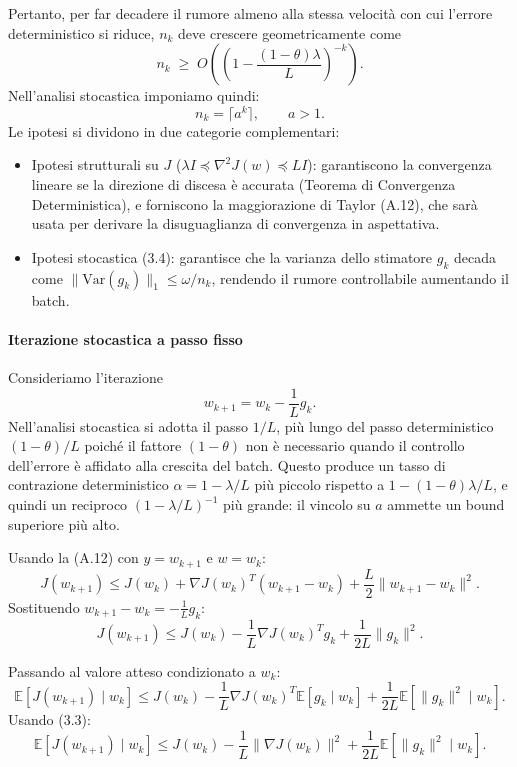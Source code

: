 \documentclass[a4paper,12pt]{article}
\begin{document}
Pertanto, per far decadere il rumore almeno alla stessa velocità con cui l'errore deterministico si riduce, \(n_k\) deve crescere geometricamente come
\[
n_k \;\ge\; O\!\left(\left(1 - \frac{(1-\theta)\lambda}{L}\right)^{-k}\right).
\]
Nell'analisi stocastica imponiamo quindi:
\[
n_k = \lceil a^k \rceil, \qquad a > 1. \tag{3.9}
\]
Le ipotesi si dividono in due categorie complementari:
\begin{itemize}
    \item Ipotesi strutturali su \(J\) (\(\lambda I \preceq \nabla^2 J(w) \preceq LI\)): garantiscono la convergenza lineare se la direzione di discesa è accurata (Teorema di Convergenza Deterministica), e forniscono la maggiorazione di Taylor (A.12), che sarà usata per derivare la disuguaglianza di convergenza in aspettativa.
    \item Ipotesi stocastica (3.4): garantisce che la varianza dello stimatore \(g_k\) decada come \(\|\mathrm{Var}(g_k)\|_1 \le \omega/n_k\), rendendo il rumore controllabile aumentando il batch.
\end{itemize}

\paragraph{Iterazione stocastica a passo fisso}

Consideriamo l'iterazione
\[
w_{k+1} = w_k - \frac{1}{L} g_k. \tag{3.10}
\]
Nell'analisi stocastica si adotta il passo $1/L$, più lungo del passo deterministico $(1-\theta)/L$ poiché il fattore $(1-\theta)$ non è necessario quando il controllo dell'errore è affidato alla crescita del batch. Questo produce un tasso di contrazione deterministico $\alpha = 1-\lambda/L$ più piccolo rispetto a $1-(1-\theta)\lambda/L$, e quindi un reciproco $(1-\lambda/L)^{-1}$ più grande: il vincolo su $a$ ammette un bound superiore più alto.

Usando la (A.12) con \(y = w_{k+1}\) e \(w = w_k\):
\[
J(w_{k+1}) \le J(w_k) + \nabla J(w_k)^T (w_{k+1} - w_k) + \frac{L}{2}\|w_{k+1} - w_k\|^2. \tag{3.11}
\]
Sostituendo \(w_{k+1} - w_k = -\frac{1}{L}g_k\):
\[
J(w_{k+1}) \le J(w_k) - \frac{1}{L}\nabla J(w_k)^T g_k + \frac{1}{2L}\|g_k\|^2. \tag{3.12}
\]

Passando al valore atteso condizionato a \(w_k\):
\[
\mathbb{E}[J(w_{k+1}) \mid w_k] \le J(w_k) - \frac{1}{L}\nabla J(w_k)^T \mathbb{E}[g_k \mid w_k] + \frac{1}{2L}\mathbb{E}[\|g_k\|^2 \mid w_k].
\]
Usando (3.3):
\[
\mathbb{E}[J(w_{k+1}) \mid w_k] \le J(w_k) - \frac{1}{L}\|\nabla J(w_k)\|^2 + \frac{1}{2L}\mathbb{E}[\|g_k\|^2 \mid w_k]. \tag{3.13}
\]
\end{document}
